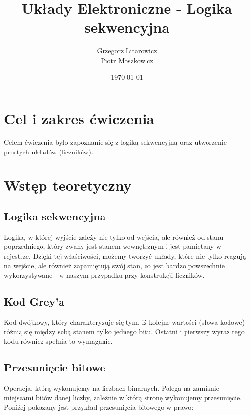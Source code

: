 \documentclass[a4paper,12pt]{article}
\begin{document}
\title{Układy Elektroniczne - Logika sekwencyjna}
\author{Grzegorz Litarowicz \\ Piotr Moszkowicz} 
\date{\today}
\maketitle
{}

\newpage
\begin{justify}
\tableofcontents
\newpage
{}

\section{Cel i zakres ćwiczenia}

Celem ćwiczenia było zapoznanie się z logiką sekwencyjną oraz utworzenie prostych układów (liczników).

\section{Wstęp teoretyczny}

\subsection{Logika sekwencyjna}

Logika, w której wyjście zależy nie tylko od wejścia, ale również od stanu poprzedniego, który zwany jest stanem wewnętrznym i jest pamiętany w rejestrze. Dzięki tej właściwości, możemy tworzyć układy, które nie tylko reagują na wejście, ale również zapamiętują swój stan, co jest bardzo powszechnie wykorzystywane - w naszym przypadku przy konstrukcji liczników.

\subsection{Kod Grey'a}
\label{grey}

Kod dwójkowy, który charakteryzuje się tym, iż kolejne wartości (słowa kodowe) różnią się między sobą stanem tylko jednego bitu. Ostatni i pierwszy wyraz tego kodu również spełnia to wymaganie.

\subsection{Przesunięcie bitowe}
\label{przesbit}

Operacja, którą wykonujemy na liczbach binarnych. Polega na zamianie miejscami bitów danej liczby, zależnie w którą stronę wykonujemy przesunięcie. Poniżej pokazany jest przykład przesunięcia bitowego w prawo:


\end{justify}
\end{document}

